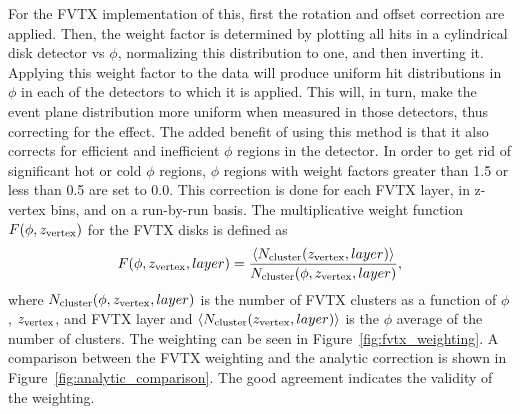For the FVTX implementation of this, first the rotation and offset correction are applied. Then, the weight factor is determined by plotting all hits in a cylindrical disk detector vs $\phi$, normalizing this distribution to one, and then inverting it. Applying this weight factor to the data will produce uniform hit distributions in $\phi$ in each of the detectors to which it is applied. This will, in turn, make the event plane distribution more uniform when measured in those detectors, thus correcting for the effect. The added benefit of using this method is that it also corrects for efficient and inefficient $\phi$ regions in the detector. In order to get rid of significant hot or cold $\phi$ regions, $\phi$ regions with weight factors greater than 1.5 or less than 0.5 are set to 0.0. This correction is done for each FVTX layer, in z-vertex bins, and on a run-by-run basis. The multiplicative weight function $F(\phi,z_{\rm vertex})$ for the FVTX disks is defined as 
\begin{equation}
F(\phi,z_{\rm vertex},layer) = \frac{\left<N_{\rm cluster}(z_{\rm vertex},layer)\right>}{N_{\rm cluster}(\phi,z_{\rm vertex},layer)},
\end{equation}
where $N_{\rm cluster}(\phi,z_{\rm vertex},layer)$ is the number of FVTX clusters as a function of $\phi$, $z_{\rm vertex}$, and FVTX layer and $\left<N_{\rm cluster}(z_{\rm vertex},layer)\right>$ is the $\phi$ average of the number of clusters. The weighting can be seen in Figure~\ref{fig:fvtx_weighting}. A comparison between the FVTX weighting and the analytic correction is shown in Figure~\ref{fig:analytic_comparison}. The good agreement indicates the validity of the weighting.

